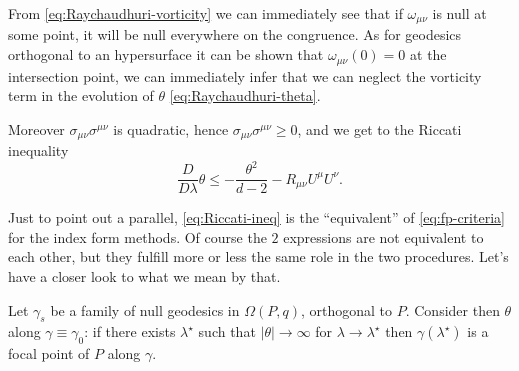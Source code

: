 	From \eqref{eq:Raychaudhuri-vorticity} we can immediately see that if \(\omega_{\mu\nu}\) is null at some point, it will be null everywhere on the congruence. As for geodesics orthogonal to an hypersurface it can be shown that \(\omega_{\mu\nu}(0) = 0\) at the intersection point, we can immediately infer that we can neglect the vorticity term in the evolution of \(\theta\) \eqref{eq:Raychaudhuri-theta}.
	
	\noindent Moreover \(\sigma_{\mu\nu}\sigma^{\mu\nu}\) is quadratic, hence \(\sigma_{\mu\nu}\sigma^{\mu\nu} \ge 0\), and we get to the Riccati inequality
	\begin{equation}
		\label{eq:Riccati-ineq}
		\frac{D}{D\lambda}\theta \le -\frac{\theta^2}{d - 2} - R_{\mu\nu}U^{\mu}U^{\nu}.
	\end{equation}
	
	Just to point out a parallel, \eqref{eq:Riccati-ineq} is the ``equivalent'' of \eqref{eq:fp-criteria} for the index form methods. Of course the \(2\) expressions are not equivalent to each other, but they fulfill more or less the same role in the two procedures. Let's have a closer look to what we mean by that.
	
	\begin{prop}
		\label{prop:fp-criteria-Raychaudhuri}
		Let \(\gamma_s\) be a family of null geodesics in \(\Omega(P,q)\), orthogonal to \(P\). Consider then \(\theta\) along \(\gamma \equiv \gamma_0\): if there exists \(\lambda^{\star}\) such that \(\vert\theta\vert \rightarrow \infty\) for \(\lambda \rightarrow \lambda^{\star}\) then \(\gamma(\lambda^{\star})\) is a focal point of \(P\) along \(\gamma\).
	\end{prop}

